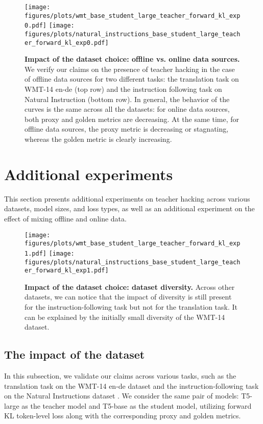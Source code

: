 \begin{figure}[ht]
    \centering
    \texttt{[image: figures/plots/wmt\_base\_student\_large\_teacher\_forward\_kl\_exp0.pdf]}
    \texttt{[image: figures/plots/natural\_instructions\_base\_student\_large\_teacher\_forward\_kl\_exp0.pdf]}
    \caption{\textbf{Impact of the dataset choice: offline vs. online data sources.} 
    We verify our claims on the presence of teacher hacking in the case of offline data sources for two different tasks: the translation task on WMT-14 en-de (top row) and the instruction following task on Natural Instruction (bottom row). In general, the behavior of the curves is the same across all the datasets: for online data sources, both proxy and golden metrics are decreasing. At the same time, for offline data sources, the proxy metric is decreasing or stagnating, whereas the golden metric is clearly increasing.
    }
    \label{fig:datasets_exp_large_to_base_online_fwd_kl}
\end{figure}

\section{Additional experiments}\label{app:add_plots}

This section presents additional experiments on teacher hacking across various datasets, model sizes, and loss types, as well as an additional experiment on the effect of mixing offline and online data.

\begin{figure}[ht]
    \centering
    \texttt{[image: figures/plots/wmt\_base\_student\_large\_teacher\_forward\_kl\_exp1.pdf]}
    \texttt{[image: figures/plots/natural\_instructions\_base\_student\_large\_teacher\_forward\_kl\_exp1.pdf]}
    \caption{\textbf{Impact of the dataset choice: dataset diversity.} Across other datasets, we can notice that the impact of diversity is still present for the instruction-following task but not for the translation task. It can be explained by the initially small diversity of the WMT-14 dataset.
    }
    \label{fig:datasets_exp_large_to_base_diversity_fwd_kl}
\end{figure}

\subsection{The impact of the dataset}

In this subsection, we validate our claims across various tasks, such as the translation task on the WMT-14 en-de dataset \cite{bojar2014findings} and the instruction-following task on the Natural Instructions dataset \cite{naturalinstructions,supernaturalinstructions}. We consider the same pair of models: T5-large as the teacher model and T5-base as the student model, utilizing forward KL token-level loss along with the corresponding proxy and golden metrics.

